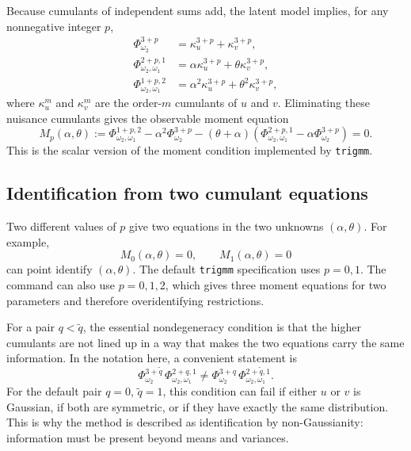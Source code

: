 \documentclass[11pt]{article}
\theoremstyle{plain}
\theoremstyle{definition}
\theoremstyle{remark}
\begin{document}
Because cumulants of independent sums add, the latent model implies, for any
nonnegative integer $p$,
\begin{align}
\Phi_{\omega_2}^{3+p} &= \kappa_u^{3+p}+\kappa_v^{3+p},\label{eq:kappa1}\\
\Phi_{\omega_2,\omega_1}^{2+p,1} &= \alpha\kappa_u^{3+p}+\theta\kappa_v^{3+p},\label{eq:kappa2}\\
\Phi_{\omega_2,\omega_1}^{1+p,2} &= \alpha^2\kappa_u^{3+p}+\theta^2\kappa_v^{3+p},
\label{eq:kappa3}
\end{align}
where $\kappa_u^{m}$ and $\kappa_v^{m}$ are the order-$m$ cumulants of $u$ and
$v$. Eliminating these nuisance cumulants gives the observable moment equation
\begin{equation}
M_p(\alpha,\theta):=
\Phi_{\omega_2,\omega_1}^{1+p,2}-\alpha^2\Phi_{\omega_2}^{3+p}
-(\theta+\alpha)\left(\Phi_{\omega_2,\omega_1}^{2+p,1}-\alpha\Phi_{\omega_2}^{3+p}\right)=0.
\label{eq:Mp}
\end{equation}
This is the scalar version of the moment condition implemented by \texttt{trigmm}.

\subsection{Identification from two cumulant equations}

Two different values of $p$ give two equations in the two unknowns $(\alpha,\theta)$.
For example,
\begin{equation}
M_0(\alpha,\theta)=0,
\qquad
M_1(\alpha,\theta)=0
\label{eq:M01}
\end{equation}
can point identify $(\alpha,\theta)$. The default \texttt{trigmm} specification
uses $p=0,1$. The command can also use $p=0,1,2$, which gives three moment
equations for two parameters and therefore overidentifying restrictions.

For a pair $q<\widetilde q$, the essential nondegeneracy condition is that the
higher cumulants are not lined up in a way that makes the two equations carry the
same information. In the notation here, a convenient statement is
\begin{equation}
\Phi_{\omega_2}^{3+\widetilde q}\,\Phi_{\omega_2,\omega_1}^{2+q,1}
\ne
\Phi_{\omega_2}^{3+q}\,\Phi_{\omega_2,\omega_1}^{2+\widetilde q,1}.
\label{eq:nondegenerate}
\end{equation}
For the default pair $q=0$, $\widetilde q=1$, this condition can fail if either
$u$ or $v$ is Gaussian, if both are symmetric, or if they have exactly the same
distribution. This is why the method is described as identification by
non-Gaussianity: information must be present beyond means and variances.
\end{document}
